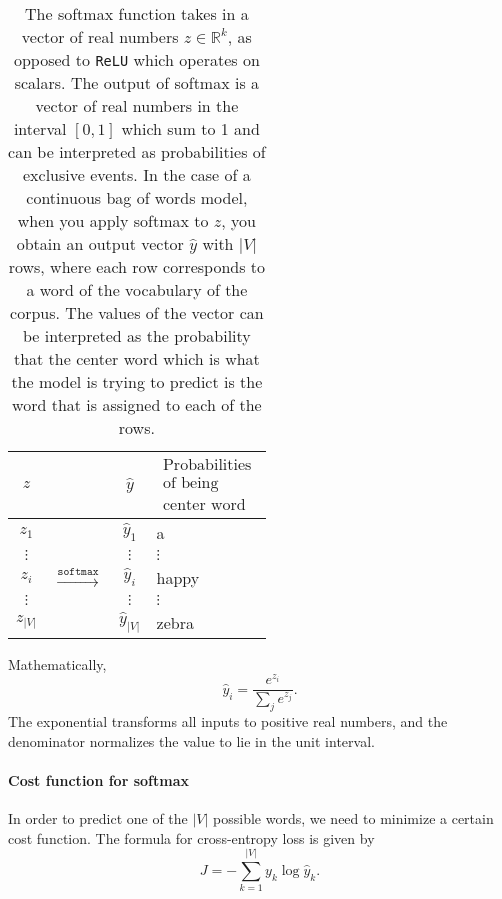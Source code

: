 \documentclass[12pt]{article}
\begin{document}
\begin{table}[h]
  \begin{center}
    \begin{tabular}{c c c |l}
      $z$ & & $\hat y$  & $\substack{\textrm{Probabilities} \\ \textrm{of being} \\ \textrm{center word}}$\\
      \hline
      $z_1$ & & $\hat y_1$ & a \\
      $\vdots$ & & $\vdots$  & $\vdots$ \\
      $z_i$ & $\overset{\texttt{softmax}}{\longrightarrow}$ & $\hat y_i$ & happy \\
      $\vdots$ & & $\vdots$ & $\vdots$ \\
      $z_{|V|}$ & & $\hat y_{|V|}$ & zebra
    \end{tabular}
    \caption{The softmax function takes in a vector of real numbers $z \in \mathbb R^k$, as opposed to \texttt{ReLU} which operates on scalars. The output of softmax is a vector of real numbers in the interval $[0,1]$ which sum to 1 and can be interpreted as probabilities of exclusive events. In the case of a continuous bag of words model, when you apply softmax to $z$, you obtain an output vector $\hat y$ with $|V|$ rows, where each row corresponds to a word of the vocabulary of the corpus. The values of the vector can be interpreted as the probability that the center word which is what the model is trying to predict is the word that is assigned to each of the rows.}
  \end{center}
\end{table}

Mathematically,
\[
  \hat y_i = \frac{e^{z_i}}{\sum_j e^{z_j}}.
\]
The exponential transforms all inputs to positive real numbers, and the denominator normalizes the value to lie in the unit interval.

\paragraph{Cost function for softmax} In order to predict one of the $|V|$ possible words, we need to minimize a certain cost function.
The formula for cross-entropy loss is given by
\[
  J = -\sum_{k=1}^{|V|} y_k \log \hat y_k.
\]
\end{document}

